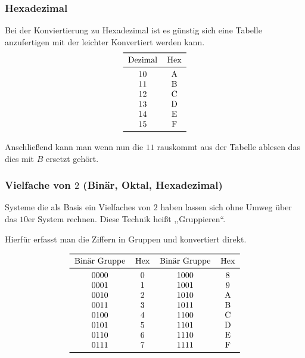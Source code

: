 \documentclass{article}
\begin{document}
\subsubsection{Hexadezimal}

Bei der Konviertierung zu Hexadezimal ist es günstig sich eine Tabelle anzufertigen mit der leichter Konvertiert werden kann.
\begin{align*}
    \begin{tabular}{cc}
        \toprule
        {Dezimal} & {Hex} \\
        \midrule
        10        & A     \\
        11        & B     \\
        12        & C     \\
        13        & D     \\
        14        & E     \\
        15        & F     \\
        \bottomrule
    \end{tabular}
\end{align*}

Anschließend kann man wenn nun die $11$ rauskommt aus der Tabelle ablesen das dies mit $B$ ersetzt gehört.

\subsubsection{Vielfache von $2$ (Binär, Oktal, Hexadezimal)}

Systeme die als Basis ein Vielfaches von $2$ haben lassen sich ohne Umweg über das $10$er System rechnen.
Diese Technik heißt ,,Gruppieren``.

Hierfür erfasst man die Ziffern in Gruppen und konvertiert direkt.

\begin{align*}
    \begin{tabular}{cccc}
        \toprule
        {Binär Gruppe} & {Hex} & {Binär Gruppe} & {Hex} \\
        \midrule
        0000           & 0     & 1000           & 8     \\
        0001           & 1     & 1001           & 9     \\
        0010           & 2     & 1010           & A     \\
        0011           & 3     & 1011           & B     \\
        0100           & 4     & 1100           & C     \\
        0101           & 5     & 1101           & D     \\
        0110           & 6     & 1110           & E     \\
        0111           & 7     & 1111           & F     \\
        \bottomrule
    \end{tabular}
\end{align*}
\end{document}
